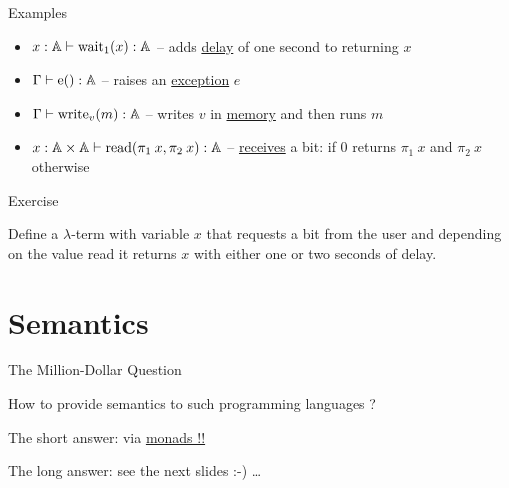 \documentclass{beamer}
\begin{document}
\begin{slide}{Examples}
  \begin{itemize}
          \item $x : \mathbb{A} \vdash \mathrm{wait}_1(x) : \mathbb{A} $ -- adds
                \alert{\underline{delay}} of one second to returning $x$
                \\[20pt]
          \item $\Gamma \vdash \mathrm{e}() : \mathbb{A}$ -- raises an 
                \alert{\underline{exception}} $e$
                \\[20pt]
          \item $\Gamma \vdash \mathrm{write}_v(m) : \mathbb{A}$ -- writes 
                $v$ in \alert{\underline{memory}} and then runs $m$
                \\[20pt]
          \item $x : \mathbb{A} \times \mathbb{A} \vdash \mathrm{read}(\pi_1 \> x,
                  \pi_2 \> x) : \mathbb{A}$ -- \alert{\underline{receives}} a bit:
                  if $0$ returns $\pi_1 \> x$ and $\pi_2 \> x$ otherwise
  \end{itemize}
\end{slide}

\begin{frame}{Exercise}

    Define a $\lambda$-term with variable $x$ that requests a bit from the user
    and depending on the value read it returns $x$ with either one or two
    seconds of delay.

\end{frame}

\section{Semantics}

\begin{slide}{The Million-Dollar Question}

  How to provide semantics to such programming languages ?

  The short answer: via \alert{\underline{monads !!}}

  The long answer: see the next slides :-) \dots

\end{slide}
\end{document}

